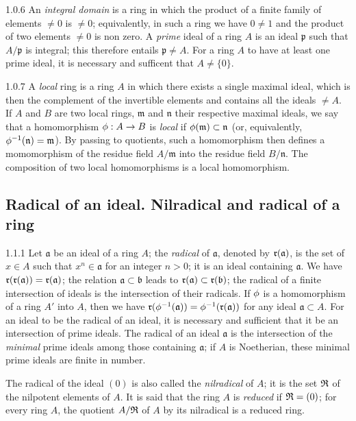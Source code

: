 \documentclass[10pt,oneside]{book}
\begin{document}
\begin{env}{1.0.6}
\label{env-0.1.0.6}
An \emph{integral domain} is a ring in which the product of a finite family of elements
$\neq 0$ is $\neq 0$; equivalently, in such a ring we have $0\neq 1$ and the product of
two elements $\neq 0$ is non zero. A \emph{prime} ideal of a ring $A$ is an ideal
$\mathfrak{p}$ such that $A/\mathfrak{p}$ is integral; this therefore entails
$\mathfrak{p}\neq A$. For a ring $A$ to have at least one prime ideal, it is necessary and
sufficent that $A\neq\{0\}$.
\end{env}

\begin{env}{1.0.7}
\label{env-0.1.0.7}
A \emph{local} ring is a ring $A$ in which there exists a single maximal ideal, which is then
the complement of the invertible elements and contains all the ideals $\neq A$. If $A$ and $B$
are two local rings, $\mathfrak{m}$ and $\mathfrak{n}$ their respective maximal ideals, we say that a
homomorphism $\phi:A\to B$ is \emph{local} if $\phi(\mathfrak{m})\subset\mathfrak{n}$ (or, equivalently,
$\phi^{-1}(\mathfrak{n})=\mathfrak{m}$). By passing to quotients, such a homomorphism then defines
a momomorphism of the residue field $A/\mathfrak{m}$ into the residue field $B/\mathfrak{n}$. The
composition of two local homomorphisms is a local homomorphism.
\end{env}

\subsection{Radical of an ideal. Nilradical and radical of a ring}
\label{0-prelim-1.1}

\begin{env}{1.1.1}
\label{env-0.1.1.1}
Let $\mathfrak{a}$ be an ideal of a ring $A$; the \emph{radical} of $\mathfrak{a}$, denoted
by $\mathfrak{r}(\mathfrak{a})$, is the set of $x\in A$ such that $x^n\in\mathfrak{a}$ for
an integer $n>0$; it is an ideal containing $\mathfrak{a}$. We have
$\mathfrak{r}(\mathfrak{r}(\mathfrak{a}))=\mathfrak{r}(\mathfrak{a})$; the relation
$\mathfrak{a}\subset\mathfrak{b}$ leads to $\mathfrak{r}(\mathfrak{a})\subset\mathfrak{r}(\mathfrak{b})$;
the radical of a finite intersection of ideals is the intersection of their radicals. If $\phi$
is a homomorphism of a ring $A'$ into $A$, then we have
$\mathfrak{r}(\phi^{-1}(\mathfrak{a}))=\phi^{-1}(\mathfrak{r}(\mathfrak{a}))$
for any ideal $\mathfrak{a}\subset A$. For an ideal to be the radical of an ideal,
it is necessary and sufficient that it be an intersection of prime ideals. The radical of an
ideal $\mathfrak{a}$ is the intersection of the
\emph{minimal} prime ideals among those containing $\mathfrak{a}$; if $A$ is
Noetherian, these minimal prime ideals are finite in number.

The radical of the ideal $(0)$ is also called the \emph{nilradical} of $A$; it is the set
$\mathfrak{R}$ of the nilpotent elements of $A$. It is said that the ring $A$ is \emph{reduced} if
$\mathfrak{R}=(0)$; for every ring $A$, the quotient $A/\mathfrak{R}$ of $A$ by its nilradical is a
reduced ring.
\end{env}
\end{document}
